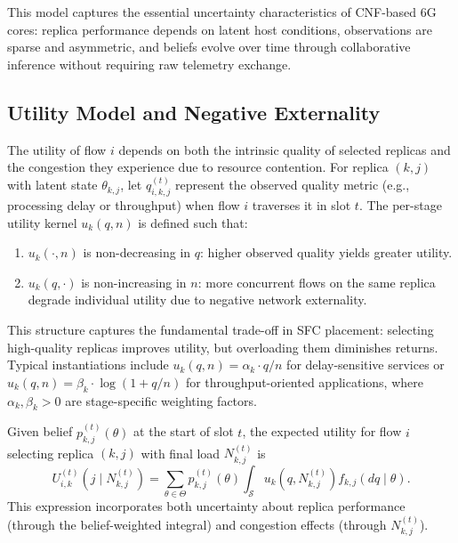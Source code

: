 \documentclass[journal]{IEEEtran}
\theoremstyle{plain}
\theoremstyle{definition}
\theoremstyle{remark}
\begin{document}
This model captures the essential uncertainty characteristics of CNF-based 6G cores: replica performance depends on latent host conditions, observations are sparse and asymmetric, and beliefs evolve over time through collaborative inference without requiring raw telemetry exchange.


\subsection{Utility Model and Negative Externality}
\label{sec:sys_utility}

The utility of flow $i$ depends on both the intrinsic quality of selected replicas and the congestion they experience due to resource contention. For replica $(k,j)$ with latent state $\theta_{k,j}$, let $q_{i,k,j}^{(t)}$ represent the observed quality metric (e.g., processing delay or throughput) when flow $i$ traverses it in slot $t$. The per-stage utility kernel $u_k(q,n)$ is defined such that:

\begin{enumerate}
    \item $u_k(\cdot,n)$ is non-decreasing in $q$: higher observed quality yields greater utility.
    \item $u_k(q,\cdot)$ is non-increasing in $n$: more concurrent flows on the same replica degrade individual utility due to negative network externality.
\end{enumerate}

This structure captures the fundamental trade-off in SFC placement: selecting high-quality replicas improves utility, but overloading them diminishes returns. Typical instantiations include $u_k(q,n) = \alpha_k \cdot q / n$ for delay-sensitive services or $u_k(q,n) = \beta_k \cdot \log(1 + q/n)$ for throughput-oriented applications, where $\alpha_k,\beta_k>0$ are stage-specific weighting factors.

Given belief $p_{k,j}^{(t)}(\theta)$ at the start of slot $t$, the expected utility for flow $i$ selecting replica $(k,j)$ with final load $N_{k,j}^{(t)}$ is
\begin{equation}
U_{i,k}^{(t)}(j \mid N_{k,j}^{(t)}) = \sum_{\theta \in \Theta} p_{k,j}^{(t)}(\theta) \int_{\mathcal{S}} u_k(q, N_{k,j}^{(t)}) f_{k,j}(dq \mid \theta).
\label{eq:stage_expected_utility}
\end{equation}
This expression incorporates both uncertainty about replica performance (through the belief-weighted integral) and congestion effects (through $N_{k,j}^{(t)}$).
\end{document}
